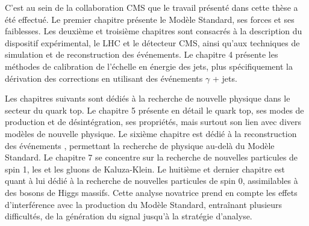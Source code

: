 \bigskip

C'est au sein de la collaboration CMS que le travail présenté dans cette thèse a été effectué. Le premier chapitre présente le Modèle Standard, ses forces et ses faiblesses. Les deuxième et troisième chapitres sont consacrés à la description du dispositif expérimental, le LHC et le détecteur CMS, ainsi qu'aux techniques de simulation et de reconstruction des événements. Le chapitre 4 présente les méthodes de calibration de l'échelle en énergie des jets, plus spécifiquement la dérivation des corrections en utilisant des événements $\gamma$ + jets.

\medskip

Les chapitres suivants sont dédiés à la recherche de nouvelle physique dans le secteur du quark top. Le chapitre 5 présente en détail le quark top, ses modes de production et de désintégration, ses propriétés, mais surtout son lien avec divers modèles de nouvelle physique. Le sixième chapitre est dédié à la reconstruction des événements \ttbar, permettant la recherche de physique au-delà du Modèle Standard. Le chapitre 7 se concentre sur la recherche de nouvelles particules de spin 1, les \zprime et les gluons de Kaluza-Klein. Le huitième et dernier chapitre est quant à lui dédié à la recherche de nouvelles particules de spin 0, assimilables à des bosons de Higgs massifs. Cette analyse novatrice prend en compte les effets d'interférence avec la production du Modèle Standard, entraînant plusieurs difficultés, de la génération du signal jusqu'à la stratégie d'analyse.